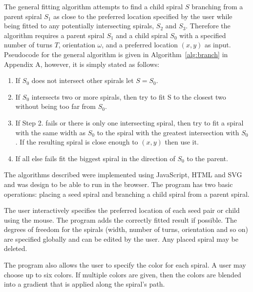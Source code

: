 \documentclass[11pt]{IEEEtran}
\begin{document}
The general fitting algorithm attempts to find a child spiral $S$ branching from a parent spiral $S_{1}$ as close to the preferred location specified by the user while being fitted to any potentially intersecting spirals, $S_{2}$ and $S_{3}$. Therefore the algorithm requires a parent spiral $S_{1}$ and a child spiral $S_{0}$ with a specified number of turns $T$, orientation $\omega$, and a preferred location $(x, y)$ as input. Pseudocode for the general algorithm is given in Algorithm~\ref{alg:branch} in Appendix A, however, it is simply stated as follows:
\begin{enumerate}
	\item If $S_{0}$ does not intersect other spirals let $S = S_{0}$.
	\item If $S_{0}$ intersects two or more spirals, then try to fit S to the closest two without being too far from $S_{0}$.
	\item If Step 2. fails or there is only one intersecting spiral, then try to fit a spiral with the same width as $S_{0}$ to the spiral with the greatest intersection with $S_{0}$. If the resulting spiral is close enough to $(x, y)$ then use it.
	\item If all else fails fit the biggest spiral in the direction of $S_{0}$ to the parent.
\end{enumerate}

The algorithms described were implemented using JavaScript, HTML and SVG and was design to be able to run in the browser. The program has two basic operations: placing a seed spiral and branching a child spiral from a parent spiral.

The user interactively specifies the preferred location of each seed pair or child using the mouse. The program adds the correctly fitted result if possible. The degrees of freedom for the spirals (width, number of turns, orientation and so on) are specified globally and can be edited by the user. Any placed spiral may be deleted.

The program also allows the user to specify the color for each spiral. A user may choose up to six colors. If multiple colors are given, then the colors are blended into a gradient that is applied along the spiral's path. 
\end{document}
